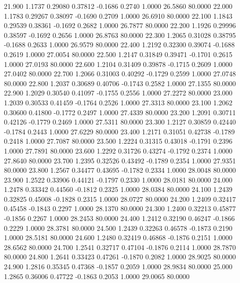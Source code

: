  21.900   1.1737   0.29080   0.37812  -0.1686   0.2740   1.0000  26.5860  80.0000
  22.000   1.1783   0.29267   0.38097  -0.1690   0.2709   1.0000  26.6910  80.0000
  22.100   1.1843   0.29539   0.38361  -0.1692   0.2682   1.0000  26.7877  80.0000
  22.200   1.1926   0.29996   0.38597  -0.1692   0.2656   1.0000  26.8763  80.0000
  22.300   1.2065   0.31028   0.38795  -0.1688   0.2633   1.0000  26.9579  80.0000
  22.400   1.2192   0.32300   0.39074  -0.1688   0.2619   1.0000  27.0054  80.0000
  22.500   1.2147   0.31849   0.39471  -0.1701   0.2615   1.0000  27.0193  80.0000
  22.600   1.2104   0.31409   0.39878  -0.1715   0.2609   1.0000  27.0402  80.0000
  22.700   1.2066   0.31003   0.40292  -0.1729   0.2599   1.0000  27.0748  80.0000
  22.800   1.2037   0.30689   0.40706  -0.1743   0.2582   1.0000  27.1355  80.0000
  22.900   1.2029   0.30540   0.41097  -0.1755   0.2556   1.0000  27.2272  80.0000
  23.000   1.2039   0.30533   0.41459  -0.1764   0.2526   1.0000  27.3313  80.0000
  23.100   1.2062   0.30600   0.41800  -0.1772   0.2497   1.0000  27.4339  80.0000
  23.200   1.2091   0.30711   0.42126  -0.1779   0.2469   1.0000  27.5311  80.0000
  23.300   1.2127   0.30859   0.42440  -0.1784   0.2443   1.0000  27.6229  80.0000
  23.400   1.2171   0.31051   0.42738  -0.1789   0.2418   1.0000  27.7087  80.0000
  23.500   1.2224   0.31315   0.43018  -0.1791   0.2396   1.0000  27.7891  80.0000
  23.600   1.2292   0.31726   0.43274  -0.1792   0.2374   1.0000  27.8640  80.0000
  23.700   1.2395   0.32526   0.43492  -0.1789   0.2354   1.0000  27.9351  80.0000
  23.800   1.2567   0.34477   0.43695  -0.1782   0.2334   1.0000  28.0048  80.0000
  23.900   1.2522   0.33906   0.44121  -0.1797   0.2330   1.0000  28.0181  80.0000
  24.000   1.2478   0.33342   0.44560  -0.1812   0.2325   1.0000  28.0384  80.0000
  24.100   1.2439   0.32825   0.45008  -0.1828   0.2315   1.0000  28.0727  80.0000
  24.200   1.2409   0.32417   0.45458  -0.1843   0.2297   1.0000  28.1370  80.0000
  24.300   1.2400   0.32213   0.45877  -0.1856   0.2267   1.0000  28.2453  80.0000
  24.400   1.2412   0.32190   0.46247  -0.1866   0.2229   1.0000  28.3781  80.0000
  24.500   1.2439   0.32263   0.46578  -0.1873   0.2190   1.0000  28.5181  80.0000
  24.600   1.2480   0.32419   0.46868  -0.1876   0.2151   1.0000  28.6562  80.0000
  24.700   1.2541   0.32717   0.47104  -0.1876   0.2114   1.0000  28.7870  80.0000
  24.800   1.2641   0.33423   0.47261  -0.1870   0.2082   1.0000  28.9025  80.0000
  24.900   1.2816   0.35345   0.47368  -0.1857   0.2059   1.0000  28.9834  80.0000
  25.000   1.2865   0.36006   0.47722  -0.1863   0.2053   1.0000  29.0065  80.0000
